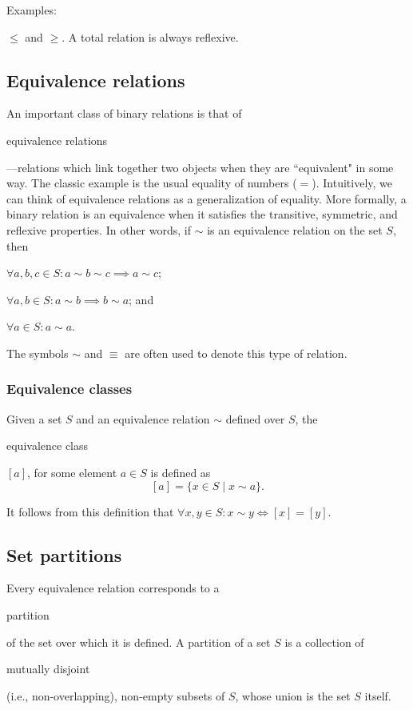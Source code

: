 \documentclass[11pt]{article}
\theoremstyle{plain}
\theoremstyle{definition}
\newenvironment{packed_items}{
\begin{itemize}
  \setlength{\itemsep}{1pt}
  \setlength{\parskip}{0pt}
  \setlength{\parsep}{0pt}
}{\end{itemize}}
\begin{document}
\noindent \begin{em}Examples:\end{em} $ \le $ and $ \ge $. 
A total relation is always reflexive. 

\subsection*{Equivalence relations}

An important class of binary relations is that of \begin{em}equivalence relations\end{em}---relations which link together two objects when they are ``equivalent" in some way.
The classic example is the usual equality of numbers ($ = $). 
Intuitively, we can think of equivalence relations as a generalization of equality. 
More formally, a binary relation is an equivalence when it satisfies the transitive, symmetric, and reflexive properties. 
In other words, if $ \sim $ is an equivalence relation on the set $ S $, then
\begin{packed_items}
\item $ \forall a, b, c \in S : a \sim b \sim c \implies a \sim c $;
\item $ \forall a, b \in S : a \sim b \implies b \sim a $; and
\item $ \forall a \in S : a \sim a $.
\end{packed_items}

\noindent The symbols $ \sim $ and $ \equiv $ are often used to denote this type of relation. 

\subsubsection*{Equivalence classes}

Given a set $ S $ and an equivalence relation $ \sim $ defined over $ S $, the \begin{em}equivalence class\end{em} $ [a] $, for some element $ a \in S $ is defined as
$$
  [a] = \{ x \in S \mid x \sim a \}.
$$

\noindent It follows from this definition that $ \forall x, y \in S : x \sim y \iff [x] = [y] $.

\subsection*{Set partitions}

Every equivalence relation corresponds to a \begin{em}partition\end{em} of the set over which it is defined. A partition of a set $ S $ is a collection of \begin{em}mutually disjoint\end{em} (i.e., non-overlapping), non-empty subsets of $ S $, whose union is the set $ S $ itself. \\
\end{document}

